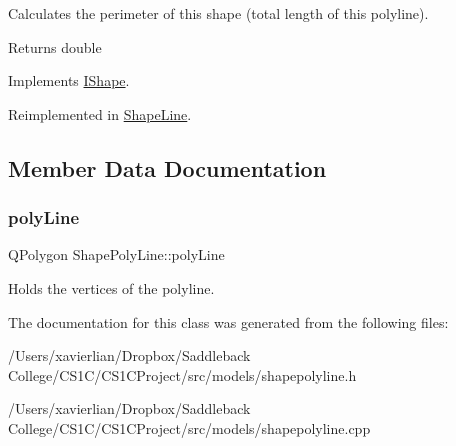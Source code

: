 Calculates the perimeter of this shape (total length of this polyline). 

\begin{DoxyReturn}{Returns}
double 
\end{DoxyReturn}


Implements \mbox{\hyperlink{class_i_shape_a485f6770c4e56b31c76d368b959b6f00}{I\+Shape}}.



Reimplemented in \mbox{\hyperlink{class_shape_line_a68b22013926993e9bd9c2d146519a5af}{Shape\+Line}}.



\subsection{Member Data Documentation}
\mbox{\label{class_shape_poly_line_ab73d17354e6862c275b8ab495cd8e995}} 
\subsubsection{\texorpdfstring{polyLine}{polyLine}}
{\footnotesize\ttfamily Q\+Polygon Shape\+Poly\+Line\+::poly\+Line}

Holds the vertices of the polyline. 

The documentation for this class was generated from the following files\+:\begin{DoxyCompactItemize}
\item 
/\+Users/xavierlian/\+Dropbox/\+Saddleback College/\+C\+S1\+C/\+C\+S1\+C\+Project/src/models/shapepolyline.\+h\item 
/\+Users/xavierlian/\+Dropbox/\+Saddleback College/\+C\+S1\+C/\+C\+S1\+C\+Project/src/models/shapepolyline.\+cpp\end{DoxyCompactItemize}
